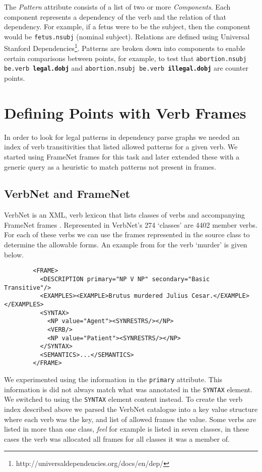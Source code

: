    The \textit{Pattern} attribute consists of a list of two or more \textit{Components}. Each component represents a dependency of the verb and the relation of that dependency. For example, if a fetus were to be the subject, then the component would be \texttt{fetus.nsubj} (nominal subject). Relations are defined using Universal Stanford Dependencies\footnote{http://universaldependencies.org/docs/en/dep/}. Patterns are broken down into components to enable certain comparisons between points, for example, to test that \texttt{abortion.nsubj be.verb \textbf{legal.dobj}} and \texttt{abortion.nsubj be.verb \textbf{illegal.dobj}} are counter points.

  \section{Defining Points with Verb Frames}
    In order to look for legal patterns in dependency parse graphs we needed an index of verb transitivities that listed allowed patterns for a given verb. We started using FrameNet frames for this task and later extended these with a generic query as a heuristic to match patterns not present in frames.
    \tocless\subsection{VerbNet and FrameNet}
      VerbNet is an XML, verb lexicon that lists classes of verbs and accompanying FrameNet frames \cite{schuler2005verbnet,fillmore2002framenet}. Represented in VerbNet's 274 `classes' are 4402 member verbs. For each of these verbs we can use the frames represented in the source class to determine the allowable forms. An example from for the verb `murder' is given below.

      \lstset{language=XML}
      \begin{lstlisting}
        <FRAME>
          <DESCRIPTION primary="NP V NP" secondary="Basic Transitive"/>
          <EXAMPLES><EXAMPLE>Brutus murdered Julius Cesar.</EXAMPLE></EXAMPLES>
          <SYNTAX>
            <NP value="Agent"><SYNRESTRS/></NP>
            <VERB/>
            <NP value="Patient"><SYNRESTRS/></NP>
          </SYNTAX>
          <SEMANTICS>...</SEMANTICS>
        </FRAME>
      \end{lstlisting}

      We experimented using the information in the \texttt{primary} attribute. This information is did not always match what was annotated in the \texttt{SYNTAX} element. We switched to using the \texttt{SYNTAX} element content instead. To create the verb index described above we parsed the VerbNet catalogue into a key value structure where each verb was the key, and list of allowed frames the value. Some verbs are listed in more than one class, \textit{feel} for example is listed in seven classes, in these cases the verb was allocated all frames for all classes it was a member of.

